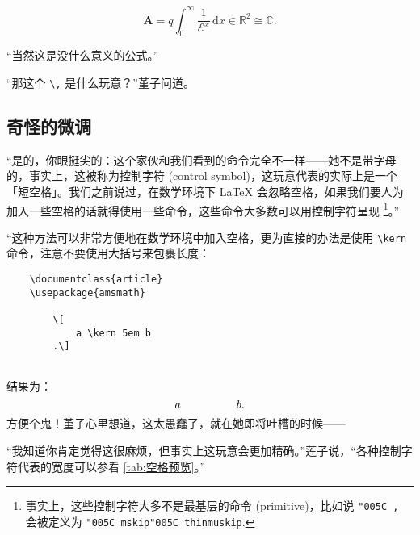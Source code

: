 {\[
    \boldsymbol{A} = q \int_0^\infty \frac{1}{\mathcal E^x}\,\mathrm{d} x \in \mathbb{R}^2  \cong \mathbb{C}
    .\]


“当然这是没什么意义的公式。”

“那这个 \verb"\," 是什么玩意？”堇子问道。


\subsection{奇怪的微调}

“是的，你眼挺尖的：这个家伙和我们看到的命令完全不一样——她不是带字母的，事实上，这被称为控制字符 (control symbol)，这玩意代表的实际上是一个「短空格」。我们之前说过，在数学环境下 \LaTeX{} 会忽略空格，如果我们要人为加入一些空格的话就得使用一些命令，这些命令大多数可以用控制字符呈现 \footnote{事实上，这些控制字符大多不是最基层的命令 (primitive)，比如说 \texttt{\char"005C ,} 会被定义为 \texttt{\char"005C mskip\char"005C thinmuskip}.}。”


“这种方法可以非常方便地在数学环境中加入空格，更为直接的办法是使用 \verb"\kern" 命令，注意不要使用大括号来包裹长度：



\begin{lstlisting}
    \documentclass{article}
    \usepackage{amsmath}
    
        \[
            a \kern 5em b
        .\]
    
\end{lstlisting}

结果为：
\[
    a   \kern 5em b
    .\]
方便个鬼！堇子心里想道，这太愚蠢了，就在她即将吐槽的时候——

“我知道你肯定觉得这很麻烦，但事实上这玩意会更加精确。”莲子说，“各种控制字符代表的宽度可以参看 \autoref{tab:空格预览}。”


}
